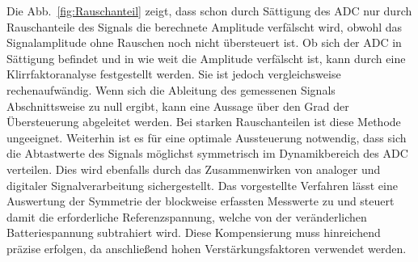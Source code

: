 
Die Abb.~\ref{fig:Rauschanteil} zeigt, dass schon durch Sättigung des ADC nur durch Rauschanteile des Signals die berechnete Amplitude verfälscht wird, obwohl das Signalamplitude ohne Rauschen noch nicht übersteuert ist. Ob sich der ADC in Sättigung befindet und in wie weit die Amplitude verfälscht ist, kann durch eine Klirrfaktoranalyse festgestellt werden. Sie ist jedoch vergleichsweise rechenaufwändig.  
Wenn sich die Ableitung des gemessenen Signals Abschnittsweise zu null ergibt, kann eine Aussage über den Grad der Übersteuerung abgeleitet werden. Bei starken Rauschanteilen ist diese Methode ungeeignet. 
Weiterhin ist es für eine optimale Aussteuerung notwendig, dass sich die Abtastwerte des Signals möglichst symmetrisch im Dynamikbereich des ADC verteilen. Dies wird ebenfalls durch das Zusammenwirken von analoger und digitaler Signalverarbeitung sichergestellt. Das vorgestellte Verfahren lässt eine Auswertung der Symmetrie der blockweise erfassten Messwerte zu und steuert damit die erforderliche Referenzspannung, welche von der veränderlichen Batteriespannung subtrahiert wird. 
Diese Kompensierung muss hinreichend präzise erfolgen, da anschließend hohen Verstärkungsfaktoren verwendet werden. 

